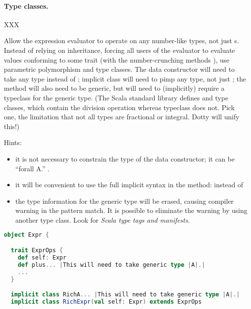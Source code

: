 \documentclass[10 pt]{article}
\begin{document}
\paragraph{Type classes.} XXX

\begin{example}
Allow the expression evaluator to operate on any number-like types, not just s. Instead of relying on inheritance, forcing all users of the evaluator to evaluate values conforming to some trait (with the number-crunching methods \pcode{+, -, *, /}), use parametric polymorphism and type classes. The  data constructor will need to take any type instead of ;  implicit class will need to pimp any type, not just ; the  method will also need to be generic, but will need to (implicitly) require a typeclass  for the generic type. (The Scala standard library defines  and  type classes, which contain the division operation whereas  typeclass does not. Pick one, the limitation that not all types are fractional or integral. Dotty will unify this!)

Hints: \begin{itemize}
  \item it is not necessary to constrain the type of the  data constructor; it can be ``forall A.'' .
  \item it will be convenient to use the full implicit syntax in the  method:  instead of 
  \item the type information for the generic type  will be erased, causing compiler warning in the pattern match. It is possible to eliminate the warning by using another type class. Look for \emph{Scala type tags and manifests}.
\end{itemize}

\begin{lstlisting}[caption={Flexible evaluator (with DSL)}, label={code:eepm2}, language=Scala, escapechar=|]
object Expr {

  trait ExprOps {
    def self: Expr
    def plus... |This will need to take generic type |A|.|
    ...
  }

  implicit class RichA... |This will need to take generic type |A|.|
  implicit class RichExpr(val self: Expr) extends ExprOps


\end{lstlisting}
\end{example}
\end{document}
